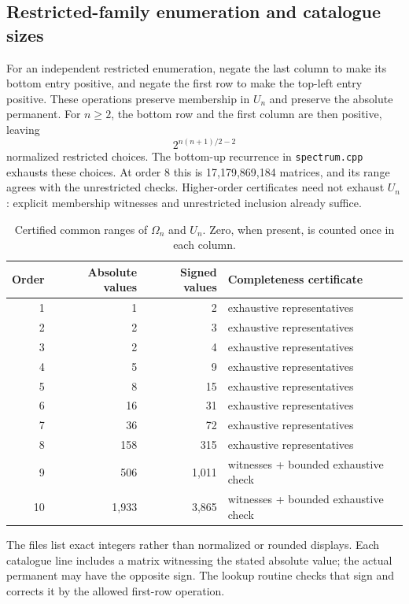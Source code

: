 \documentclass[11pt,a4paper]{article}
\theoremstyle{remark}\newtheorem{remark}[theorem]{Remark}
\newcommand{\Om}{\Omega}
\begin{document}
\subsection{Restricted-family enumeration and catalogue sizes}
For an independent restricted enumeration, negate the last column to make its bottom entry positive, and negate the first row to make the top-left entry positive. These operations preserve membership in $U_n$ and preserve the absolute permanent. For $n\geq2$, the bottom row and the first column are then positive, leaving
\[
 2^{n(n+1)/2-2}
\]
normalized restricted choices. The bottom-up recurrence in \texttt{spectrum.cpp} exhausts these choices. At order 8 this is 17,179,869,184 matrices, and its range agrees with the unrestricted checks. Higher-order certificates need not exhaust $U_n$: explicit membership witnesses and unrestricted inclusion already suffice.

\begin{table}[htbp]
\centering\small
\begin{tabular}{rrrl}
\toprule
Order & Absolute values & Signed values & Completeness certificate\\
\midrule
1 & 1 & 2 & exhaustive representatives \\
2 & 2 & 3 & exhaustive representatives \\
3 & 2 & 4 & exhaustive representatives \\
4 & 5 & 9 & exhaustive representatives \\
5 & 8 & 15 & exhaustive representatives \\
6 & 16 & 31 & exhaustive representatives \\
7 & 36 & 72 & exhaustive representatives \\
8 & 158 & 315 & exhaustive representatives \\
9 & 506 & 1,011 & witnesses + bounded exhaustive check \\
10 & 1,933 & 3,865 & witnesses + bounded exhaustive check \\
\bottomrule
\end{tabular}

\caption{Certified common ranges of $\Om_n$ and $U_n$. Zero, when present, is counted once in each column.}
\label{tab:ranges}
\end{table}

The files list exact integers rather than normalized or rounded displays. Each catalogue line includes a matrix witnessing the stated absolute value; the actual permanent may have the opposite sign. The lookup routine checks that sign and corrects it by the allowed first-row operation.
\end{document}
